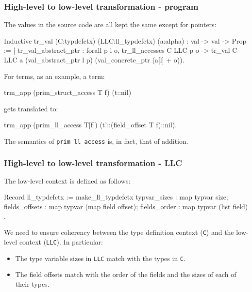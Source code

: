 \begin{frame}[fragile]
\frametitle{High-level to low-level transformation - program}

The values in the source code  are all kept the same except for pointers:

\begin{coqs}
  Inductive tr_val (C:typdefctx) (LLC:ll_typdefctx) (a:alpha) : val -> val -> Prop :=
	  | tr_val_abstract_ptr : forall p l o,
          tr_ll_accesses C LLC p o ->
      	  tr_val C LLC a (val_abstract_ptr l p) (val_concrete_ptr (a[l] + o)).
\end{coqs}

\bigskip \pause

For terms, as an example, a term:

\begin{coqs}
  trm_app (prim_struct_access T f) (t::nil)
\end{coqs}

gets translated to:

\begin{coqs}
  trm_app (prim_ll_access T[f]) (t'::(field_offset T f)::nil).
\end{coqs}

\bigskip \pause

The semantics of \texttt{prim\_ll\_access} is, in fact, that of addition.

\end{frame}


\begin{frame}[fragile]
\frametitle{High-level to low-level transformation - LLC}

The low-level context is defined as follows:

\begin{coqs}
  Record ll_typdefctx := make_ll_typdefctx {
    typvar_sizes				: map typvar size;
    fields_offsets	: map typvar (map field offset);
    fields_order				: map typvar (list field) }.
\end{coqs}

We need to ensure coherency between the type definition context (\texttt{C}) and the low-level context (\texttt{LLC}). In particular:

\begin{itemize}
	\item The type variable sizes in \texttt{LLC} match with the types in \texttt{C}.
	\item The field offsets match with the order of the fields and the sizes of each of their types.
\end{itemize}

\end{frame}


